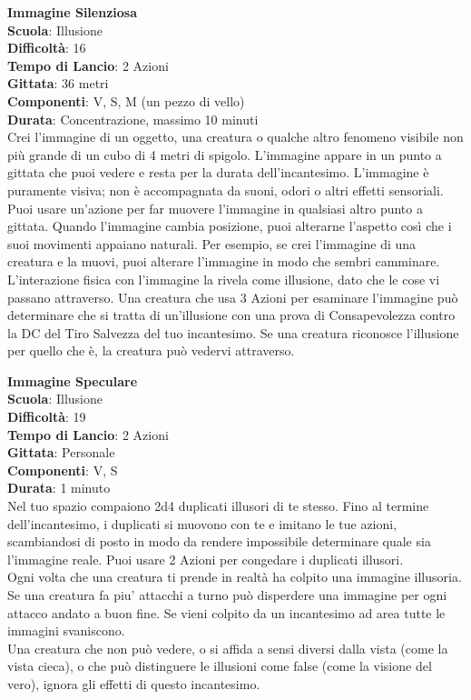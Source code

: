 \begin{multicols}{2}
\medskip\textbf{Immagine Silenziosa}\\
\textbf{Scuola}: Illusione\\
\textbf{Difficoltà}: 16\\
\textbf{Tempo di Lancio}: 2 Azioni\\
\textbf{Gittata}: 36 metri\\
\textbf{Componenti}: V, S, M (un pezzo di vello)\\
\textbf{Durata}: Concentrazione, massimo 10 minuti\\
Crei l'immagine di un oggetto, una creatura o qualche altro fenomeno visibile non più grande di un cubo di 4 metri di spigolo. L'immagine appare in un punto a gittata che puoi vedere e resta per la durata dell'incantesimo. L'immagine è puramente visiva; non è accompagnata da suoni, odori o altri effetti sensoriali. Puoi usare un'azione per far muovere l'immagine in qualsiasi altro punto a gittata. Quando l'immagine cambia posizione, puoi alterarne l'aspetto così che i suoi movimenti appaiano naturali. Per esempio, se crei l'immagine di una creatura e la muovi, puoi alterare l'immagine in modo che sembri camminare.\\
L'interazione fisica con l'immagine la rivela come illusione, dato che le cose vi passano attraverso. Una creatura che usa 3 Azioni per esaminare l'immagine può determinare che si tratta di un'illusione con una prova di Consapevolezza contro la DC del Tiro Salvezza del tuo incantesimo. Se una creatura riconosce l'illusione per quello che è, la creatura può vedervi attraverso.

\medskip\textbf{Immagine Speculare}\\
\textbf{Scuola}: Illusione\\
\textbf{Difficoltà}: 19\\
\textbf{Tempo di Lancio}: 2 Azioni\\
\textbf{Gittata}: Personale\\
\textbf{Componenti}: V, S\\
\textbf{Durata}: 1 minuto\\
Nel tuo spazio compaiono 2d4 duplicati illusori di te stesso. Fino al termine dell'incantesimo, i duplicati si muovono con te e imitano le tue azioni, scambiandosi di posto in modo da rendere impossibile determinare quale sia l'immagine reale. Puoi usare 2 Azioni per congedare i duplicati illusori.\\
Ogni volta che una creatura ti prende in realtà ha colpito una immagine illusoria.
Se una creatura fa piu' attacchi a turno può disperdere una immagine per ogni attacco andato a buon fine. Se vieni colpito da un incantesimo ad area tutte le immagini svaniscono.\\
Una creatura che non può vedere, o si affida a sensi diversi dalla vista (come la vista cieca), o che può distinguere le illusioni come false (come la visione del vero), ignora gli effetti di questo incantesimo. 


\end{multicols}

